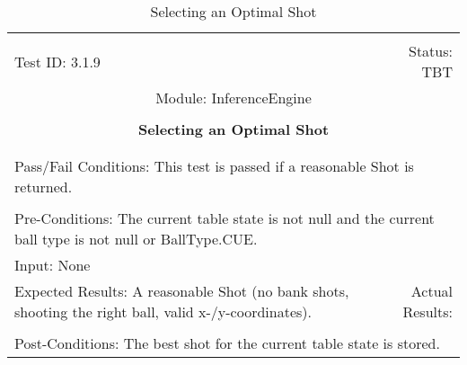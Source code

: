 \documentclass[titlepage]{article}
\begin{document}
\begin{center}%
\begin{table}
\begin{tabular}{|l r|}\hline&\\[-2mm]
	Test ID: 3.1.9	&Status: TBT\\[-3mm]
	\multicolumn{2}{|c|}{Module: InferenceEngine}\\&\\
	\multicolumn{2}{|c|}{\textbf{\large{Selecting an Optimal Shot}}}\\&\\\hline&\\[-3mm]
	\multicolumn{2}{|p{\textwidth}|}{Pass/Fail Conditions: This test is passed if a reasonable Shot is returned.}\\[1mm]\hline&\\[-3mm]
	\multicolumn{2}{|p{\textwidth}|}{Pre-Conditions: The current table state is not null and the current ball type is not null or BallType.CUE.}\\[4mm]
	\multicolumn{2}{|p{\textwidth}|}{Input: None}\\[2mm]\hline
	\multicolumn{1}{|p{0.49\textwidth}}{Expected Results: A reasonable Shot (no bank shots, shooting the right ball, valid x-/y-coordinates).}	&\multicolumn{1}{|p{0.45\textwidth}|}{Actual Results: }\\\hline&\\[-3mm]
	\multicolumn{2}{|p{\textwidth}|}{Post-Conditions: The best shot for the current table state is stored.}\\\hline
\end{tabular}
\caption{Selecting an Optimal Shot}
\end{table}
\end{center}
\end{document}

